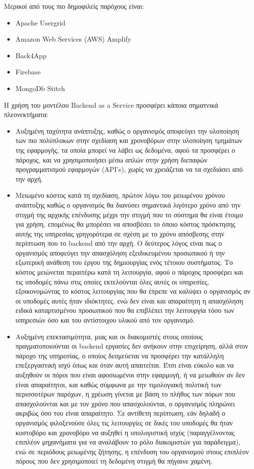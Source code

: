 \documentclass{article}
\begin{document}
Μερικοί από τους πιο δημοφιλείς παρόχους είναι:
\begin{itemize}
\item Apache Usergrid
\item Amazon Web Services (AWS) Amplify
\item Back4App
\item Firebase
\item MongoDb Stitch
\end{itemize}
Η χρήση του μοντέλου Backend as a Service προσφέρει κάποια σηματνικά πλεονεκτήματα:
\begin{itemize}
\item Αυξημένη ταχύτητα ανάπτυξης, καθώς ο οργανισμός αποφεύγει την υλοποίηση των πιο πολύπλοκων στην σχεδίαση και χρονοβόρων στην υλοποίηση τμημάτων της εφαρμογής, τα οποία μπορεί να λάβει ως δεδομένα, αφού τα προσφέρει ο πάροχος, και να χρησιμοποιήσει μέσω απλών στην χρήση διεπαφών προγραμματισμού εφαρμογών (API’s), χωρίς να χρειάζεται να τα σχεδιάσει από την αρχή.
\item Μειωμένο κόστος κατά τη σχεδίαση, πρώτον λόγω του μειωμένου χρόνου ανάπτυξης καθώς ο οργανισμός θα διανύσει σημαντικά λιγότερο χρόνο από την στιγμή της αρχικής επένδυσης μέχρι την στιγμή που το σύστημα θα είναι έτοιμο για χρήση, επομένως θα μπορέσει να αποσβέσει το όποιο κόστος πρόσκτησης αυτής της υπηρεσίας γρηγορότερα σε σχέση με το χρόνο απόσβεσης στην περίπτωση που το backend από την αρχή. Ο δεύτερος λόγος είναι πως ο οργανισμός αποφεύγει την απασχόληση εξειδικευμένου προσωπικού ή την εξωτερική ανάθεση του έργου της δημιουργίας ενός τέτοιου συστήματος. Το κόστος μειώνεται περαιτέρω κατά τη λειτουργία, αφού ο πάροχος προσφέρει και τις υποδομές πάνω στις οποίες εκτελούνται όλες αυτές οι υπηρεσίες, εξοικονομώντας το κόστος λειτουργίας που θα έπρεπε να καλύψει ο οργανισμός αν οι υποδομές αυτές ήταν ιδιόκτητες, ενώ δεν είναι και απαραίτητη η απασχόληση ειδικά καταρτισμένου προσωπικού που θα επιβλέπει την λειτουργία τόσο των υπηρεσιών όσο και του αντίστοιχου υλικού από τον οργανισμό.
\item Αυξημένη επεκτασιμότητα, μιας και οι διακομιστές στους οποίους πραγματοποιούνται οι backend εργασίες δεν ανήκουν στην επιχείρηση, αλλά στον πάροχο της υπηρεσίας, ο οποίος δεσμεύεται να προσφέρει την κατάλληλη επεξεργαστική ισχύ όπως και όταν αυτή απαιτείται. Έτσι είναι εύκολο και να αυξηθούν οι πόροι που είναι αφοσιωμένοι στην εφαρμογή, ή να μειωθούν αν δεν είναι απαραίτητοι, και καθώς σύμφωνα με την τιμολογιακή πολιτική των περισσοτέρων παρόχων, η χρέωση γίνεται με βάση το πλήθος των πόρων που απασχολούνται και με τον χρόνο που απασχολούνται, ο οργανισμός πληρώνει ακριβώς όσο του είναι απαραίτητο. Σε αντίθετη περίπτωση, εάν δηλαδή ο οργανισμός φιλοξενούσε όλες τις λειτουργίες σε δικές του υποδομές θα ήταν κοστοβόρο και χρονοβόρο να αυξηθεί η υπολογιστική ισχύς (παραγγέλνοντας επιπλέον μηχανήματα για να αναλάβουν το ρόλο διακομιστών για παράδειγμα), ενώ σε περιόδους μειωμένης ζήτησης, η επένδυση του οργανισμού στους επιπλέον πόρους που δεν χρησιμοποιεί τη δεδομένη στιγμή θα πήγαινε χαμένη.

\end{itemize}
\end{document}
